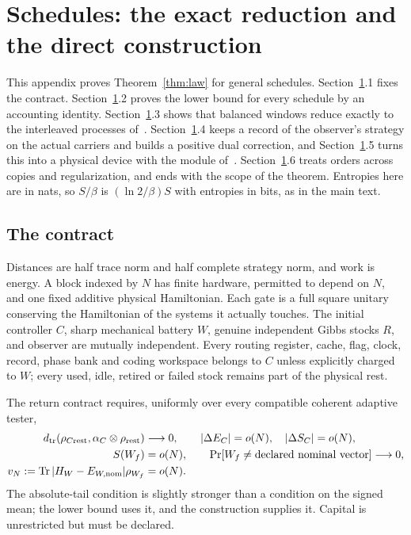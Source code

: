 \documentclass[11pt]{article}
\theoremstyle{definition}
\theoremstyle{remark}
\newcommand{\Tr}{\operatorname{Tr}}
\begin{document}
\section{Schedules: the exact reduction and the direct construction}\label{app:schedules}

This appendix proves Theorem~\ref{thm:law} for general schedules. Section~\ref{app:schedules}.1 fixes the contract. Section~\ref{app:schedules}.2 proves the lower bound for every schedule by an accounting identity. Section~\ref{app:schedules}.3 shows that balanced windows reduce exactly to the interleaved processes of~\cite{Answering}. Section~\ref{app:schedules}.4 keeps a record of the observer's strategy on the actual carriers and builds a positive dual correction, and Section~\ref{app:schedules}.5 turns this into a physical device with the module of~\cite[App.~E]{Answering}. Section~\ref{app:schedules}.6 treats orders across copies and regularization, and ends with the scope of the theorem. Entropies here are in nats, so $S/\beta$ is $(\ln2/\beta)S$ with entropies in bits, as in the main text.

\subsection{The contract}
Distances are half trace norm and half complete strategy norm, and work is energy. A block indexed by $N$ has finite hardware, permitted to depend on $N$, and one fixed additive physical Hamiltonian. Each gate is a full square unitary conserving the Hamiltonian of the systems it actually touches. The initial controller $C$, sharp mechanical battery $W$, genuine independent Gibbs stocks $R$, and observer are mutually independent. Every routing register, cache, flag, clock, record, phase bank and coding workspace belongs to $C$ unless explicitly charged to $W$; every used, idle, retired or failed stock remains part of the physical rest.

The return contract requires, uniformly over every compatible coherent adaptive tester,
\begin{align*}
d_{\rm tr}(\rho_{C\mathrm{rest}},\alpha_C\otimes\rho_{\mathrm{rest}})&\longrightarrow0,\qquad
|\Delta E_C|=o(N),\quad |\Delta S_C|=o(N),\\
S(W_f)&=o(N),\qquad
\Pr[W_f\ne\text{declared nominal vector}]\longrightarrow0,\\
v_N:=\Tr|H_W-E_{W,\mathrm{nom}}|\rho_{W_f}&=o(N).
\end{align*}
The absolute-tail condition is slightly stronger than a condition on the signed mean; the lower bound uses it, and the construction supplies it. Capital is unrestricted but must be declared.
\end{document}
